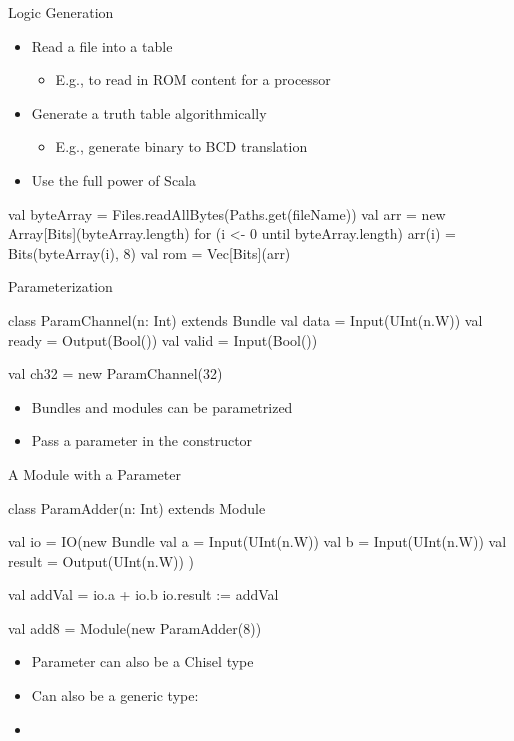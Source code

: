 \begin{frame}[fragile]{Logic Generation}
\begin{itemize}
\item Read a file into a table
\begin{itemize}
\item E.g., to read in ROM content for a processor
\end{itemize}
\item Generate a truth table algorithmically
\begin{itemize}
\item E.g., generate binary to BCD translation
\end{itemize}
\item Use the full power of Scala
\end{itemize}
\begin{chisel}
val byteArray = Files.readAllBytes(Paths.get(fileName))
val arr = new Array[Bits](byteArray.length)
for (i <- 0 until byteArray.length) {
  arr(i) = Bits(byteArray(i), 8)
}
val rom = Vec[Bits](arr)
\end{chisel}
\end{frame}

\begin{frame}[fragile]{Parameterization}
\begin{chisel}
class ParamChannel(n: Int) extends Bundle {
  val data = Input(UInt(n.W))
  val ready = Output(Bool())
  val valid = Input(Bool())
}

val ch32 = new ParamChannel(32)
\end{chisel}
\begin{itemize}
\item Bundles and modules can be parametrized
\item Pass a parameter in the constructor
\end{itemize}

\end{frame}
\begin{frame}[fragile]{A Module with a Parameter}
\begin{chisel}
class ParamAdder(n: Int) extends Module {
  val io = IO(new Bundle {
    val a = Input(UInt(n.W))
    val b = Input(UInt(n.W))
    val result = Output(UInt(n.W))
  })

  val addVal = io.a + io.b
  io.result := addVal
}

val add8 = Module(new ParamAdder(8))
\end{chisel}
\begin{itemize}
\item Parameter can also be a Chisel type
\item Can also be a generic type:
\item {}
\end{itemize}
\end{frame}

